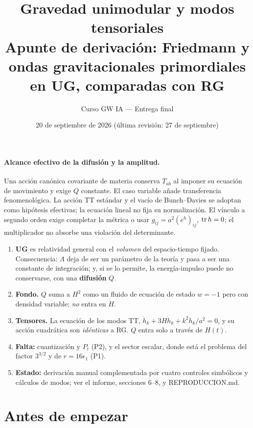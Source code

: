 \documentclass[11pt,a4paper]{article}
\title{\textbf{Gravedad unimodular y modos tensoriales}\\[0.3em]
\large Apunte de derivación: Friedmann y ondas gravitacionales primordiales en UG, comparadas con RG}
\author{Curso GW IA --- Entrega final}
\date{20 de septiembre de 2026 (última revisión: 27 de septiembre)}
\begin{document}
\paragraph{Alcance efectivo de la difusión y la amplitud.}
Una acción canónica covariante de materia conserva $T_{ab}$ al imponer su ecuación de movimiento y exige $Q$ constante. El caso variable añade transferencia fenomenológica. La acción TT estándar y el vacío de Bunch--Davies se adoptan como hipótesis efectivas; la ecuación lineal no fija su normalización. El vínculo a segundo orden exige completar la métrica o usar $g_{ij}=a^2(e^h)_{ij}$, ${\rm tr}\,h=0$; el multiplicador no absorbe una violación del determinante.

\maketitle

\begin{tcolorbox}[cajabase,colback=white,colframe=NavyBlue!65,title={El resultado en cinco líneas}]
\begin{enumerate}[nosep,leftmargin=1.4em]
\item \textbf{UG} es relatividad general con el \emph{volumen} del espacio-tiempo fijado. Consecuencia: $\Lambda$ deja de ser un parámetro de la teoría y pasa a ser una constante de integración; y, si se lo permite, la energía-impulso puede no conservarse, con una \textbf{difusión} $Q$.
\item \textbf{Fondo.} $Q$ suma a $H^2$ como un fluido de ecuación de estado $w=-1$ pero con densidad variable; \emph{no} entra en $\dot H$.
\item \textbf{Tensores.} La ecuación de los modos TT, $\ddot h_k+3H\dot h_k+k^2h_k/a^2=0$, y su acción cuadrática son \emph{idénticas} a RG. $Q$ entra solo a través de $H(t)$.
\item \textbf{Falta:} cuantización y $P_t$ (P2), y el sector escalar, donde está el problema del factor $3^{3/2}$ y de $r=16\epsilon_1$ (P1).
\item \textbf{Estado:} derivación manual complementada por cuatro controles simbólicos y cálculos de modos; ver el informe, secciones 6--8, y REPRODUCCION.md.
\end{enumerate}
\end{tcolorbox}

\setcounter{section}{-1}
\section{Antes de empezar}
\end{document}
